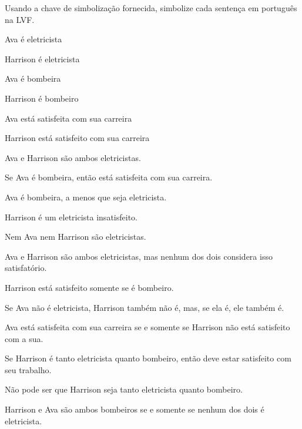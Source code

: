 \solutions

\problempart Usando a chave de simbolização fornecida, simbolize cada sentença em português na LVF.\label{pr.avacareer}
	\begin{ekey}
		\item[E_1] Ava é eletricista
		\item[E_2] Harrison é eletricista
		\item[F_1] Ava é bombeira
		\item[F_2] Harrison é bombeiro
		\item[S_1] Ava está satisfeita com sua carreira
		\item[S_2] Harrison está satisfeito com sua carreira
	\end{ekey}
\begin{compactlist}
\item Ava e Harrison são ambos eletricistas.
\item[] 
\item Se Ava é bombeira, então está satisfeita com sua carreira.
\item[] 
\item Ava é bombeira, a menos que seja eletricista.
\item[] 
\item Harrison é um eletricista insatisfeito.
\item[] 
\item Nem Ava nem Harrison são eletricistas.
\item[] 
\item Ava e Harrison são ambos eletricistas, mas nenhum dos dois considera isso satisfatório.
\item[] 
\item Harrison está satisfeito somente se é bombeiro.
\item[] 
\item Se Ava não é eletricista, Harrison também não é, mas, se ela é, ele também é.
\item[] 
\item Ava está satisfeita com sua carreira se e somente se Harrison não está satisfeito com a sua.
\item[] 
\item Se Harrison é tanto eletricista quanto bombeiro, então deve estar satisfeito com seu trabalho.
\item[] 
\item Não pode ser que Harrison seja tanto eletricista quanto bombeiro.
\item[] 
\item Harrison e Ava são ambos bombeiros se e somente se nenhum dos dois é eletricista.
\item[] 
\end{compactlist}

